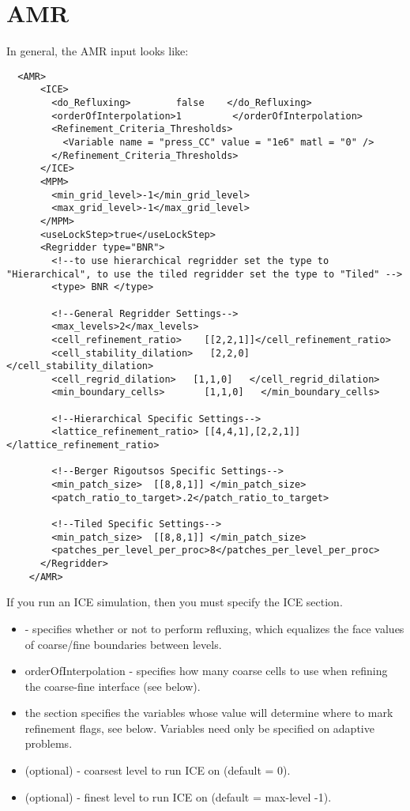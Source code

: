\section{AMR}

In general, the AMR input looks like:

\begin{lstlisting}
  <AMR>
      <ICE>
        <do_Refluxing>        false    </do_Refluxing>
        <orderOfInterpolation>1         </orderOfInterpolation>
        <Refinement_Criteria_Thresholds>
          <Variable name = "press_CC" value = "1e6" matl = "0" />
        </Refinement_Criteria_Thresholds>
      </ICE>
      <MPM>
        <min_grid_level>-1</min_grid_level>
        <max_grid_level>-1</max_grid_level>
      </MPM>
      <useLockStep>true</useLockStep>    
      <Regridder type="BNR">
        <!--to use hierarchical regridder set the type to "Hierarchical", to use the tiled regridder set the type to "Tiled" -->
        <type> BNR </type>

        <!--General Regridder Settings-->
        <max_levels>2</max_levels>
        <cell_refinement_ratio>    [[2,2,1]]</cell_refinement_ratio>
        <cell_stability_dilation>   [2,2,0]   </cell_stability_dilation>
        <cell_regrid_dilation>   [1,1,0]   </cell_regrid_dilation>
        <min_boundary_cells>       [1,1,0]   </min_boundary_cells>
        
        <!--Hierarchical Specific Settings-->
        <lattice_refinement_ratio> [[4,4,1],[2,2,1]]  </lattice_refinement_ratio>
        
        <!--Berger Rigoutsos Specific Settings-->
        <min_patch_size>  [[8,8,1]] </min_patch_size>
        <patch_ratio_to_target>.2</patch_ratio_to_target>

        <!--Tiled Specific Settings-->
        <min_patch_size>  [[8,8,1]] </min_patch_size>
        <patches_per_level_per_proc>8</patches_per_level_per_proc>         
      </Regridder>
    </AMR>

\end{lstlisting}

If you run an ICE simulation, then you must specify the ICE section. 

\begin{itemize}
\item {} - specifies whether or not to perform refluxing,
  which equalizes the face values of coarse/fine boundaries between
  levels.
\item orderOfInterpolation - specifies how many coarse cells to use
  when refining the coarse-fine interface (see below).
\item the  section specifies the
  variables whose value will determine where to mark refinement flags,
  see below. Variables need only be specified on adaptive problems.
\item {} (optional) - coarsest level to run ICE on
  (default = 0).
\item {} (optional) - finest level to run ICE on (default
  = max-level -1).

\end{itemize}

